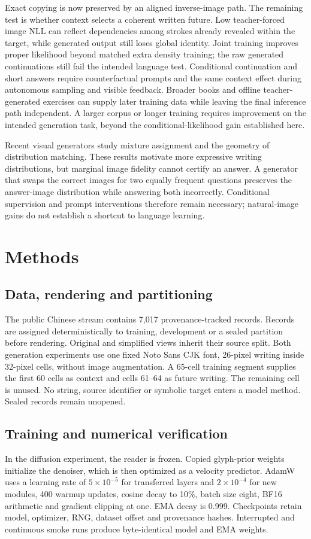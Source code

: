 Exact copying is now preserved by an aligned inverse-image path. The remaining
test is whether context selects a coherent written future. Low teacher-forced
image NLL can reflect dependencies among strokes already revealed within the
target, while generated output still loses global identity. Joint training
improves proper likelihood beyond matched extra density training; the raw
generated continuations still fail the intended language test. Conditional
continuation and short answers require counterfactual prompts and the same
context effect during autonomous sampling and visible feedback.
Broader books and offline teacher-generated exercises can supply later
training data while leaving the final inference path independent. A larger
corpus or longer training requires improvement on the intended generation
task, beyond the conditional-likelihood gain established here.

Recent visual generators study mixture assignment and the geometry of
distribution matching\cite{mgflow,semot}. These results motivate more expressive
writing distributions, but marginal image fidelity cannot certify an answer.
A generator that swaps the correct images for two equally frequent questions
preserves the answer-image distribution while answering both incorrectly.
Conditional supervision and prompt interventions therefore remain necessary;
natural-image gains do not establish a shortcut to language learning.

\section*{Methods}
\subsection*{Data, rendering and partitioning}
The public Chinese stream contains 7,017 provenance-tracked records. Records
are assigned deterministically to training, development or a sealed partition
before rendering. Original and simplified views inherit their source split.
Both generation experiments use one fixed Noto Sans CJK font, 26-pixel writing
inside 32-pixel cells, without image augmentation. A 65-cell training segment
supplies the first 60 cells as context and cells 61--64 as future writing.
The remaining cell is unused. No string, source identifier or symbolic target
enters a model method. Sealed records remain unopened.

\subsection*{Training and numerical verification}
In the diffusion experiment, the reader is frozen. Copied glyph-prior weights initialize the denoiser,
which is then optimized as a velocity predictor. AdamW uses a learning rate of
$5\times10^{-5}$ for transferred layers and $2\times10^{-4}$ for new modules,
400 warmup updates, cosine decay to 10\%, batch size eight, BF16 arithmetic and
gradient clipping at one. EMA decay is 0.999. Checkpoints retain model,
optimizer, RNG, dataset offset and provenance hashes. Interrupted and
continuous smoke runs produce byte-identical model and EMA weights.

